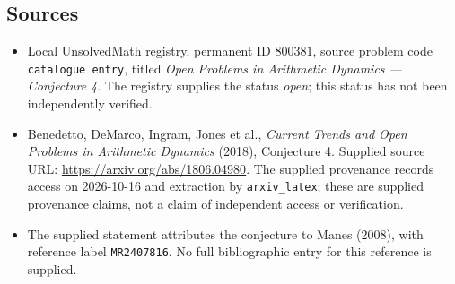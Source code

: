 \documentclass[11pt]{article}
\begin{document}
\subsection{Sources}
\begin{itemize}
\item Local UnsolvedMath registry, permanent ID \(800381\), source problem code \texttt{catalogue entry}, titled \emph{Open Problems in Arithmetic Dynamics --- Conjecture 4}. The registry supplies the status \emph{open}; this status has not been independently verified.
\item Benedetto, DeMarco, Ingram, Jones et al., \emph{Current Trends and Open Problems in Arithmetic Dynamics} (2018), Conjecture 4. Supplied source URL: \url{https://arxiv.org/abs/1806.04980}. The supplied provenance records access on 2026-10-16 and extraction by \texttt{arxiv\_latex}; these are supplied provenance claims, not a claim of independent access or verification.
\item The supplied statement attributes the conjecture to Manes (2008), with reference label \texttt{MR2407816}. No full bibliographic entry for this reference is supplied.
\end{itemize}
\end{document}
